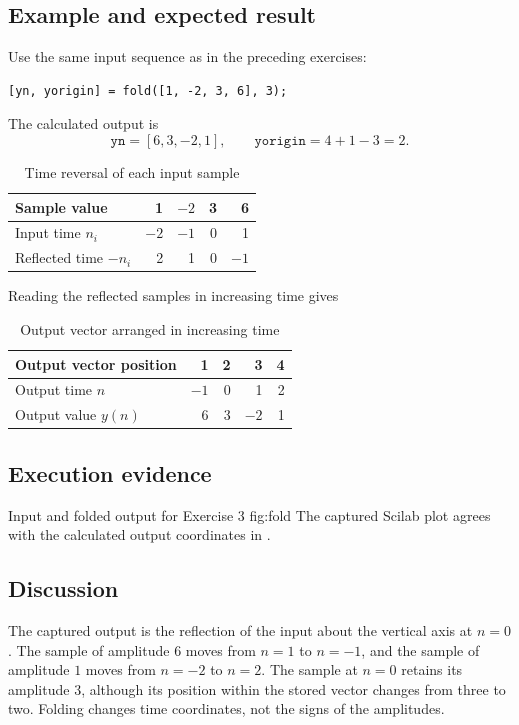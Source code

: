 \subsection{Example and expected result}
Use the same input sequence as in the preceding exercises:
\begin{lstlisting}[numbers=none]
[yn, yorigin] = fold([1, -2, 3, 6], 3);
\end{lstlisting}
The calculated output is
\[
  \texttt{yn}=[6,3,-2,1],\qquad
  \texttt{yorigin}=4+1-3=2.
\]
\begin{table}[H]
  \centering
  \caption{Time reversal of each input sample}
  \label{tab:fold-mapping}
  \begin{tabular}{lrrrr}
    \toprule
    Sample value & 1 & $-2$ & 3 & 6\\
    \midrule
    Input time $n_i$ & $-2$ & $-1$ & 0 & 1\\
    Reflected time $-n_i$ & 2 & 1 & 0 & $-1$\\
    \bottomrule
  \end{tabular}
\end{table}
Reading the reflected samples in increasing time gives
\begin{table}[H]
  \centering
  \caption{Output vector arranged in increasing time}
  \label{tab:fold-output}
  \begin{tabular}{lrrrr}
    \toprule
    Output vector position & 1 & 2 & 3 & 4\\
    \midrule
    Output time $n$ & $-1$ & 0 & 1 & 2\\
    Output value $y(n)$ & 6 & 3 & $-2$ & 1\\
    \bottomrule
  \end{tabular}
\end{table}

\subsection{Execution evidence}
  {Input and folded output for Exercise 3}
  {fig:fold}
The captured Scilab plot agrees with the calculated output coordinates
in .

\subsection{Discussion}
The captured output is the reflection of the input about the vertical
axis at $n=0$. The sample of amplitude $6$ moves from $n=1$ to $n=-1$,
and the sample of amplitude $1$ moves from $n=-2$ to $n=2$. The sample
at $n=0$ retains its amplitude $3$, although its position within the
stored vector changes from three to two. Folding changes time
coordinates, not the signs of the amplitudes.
